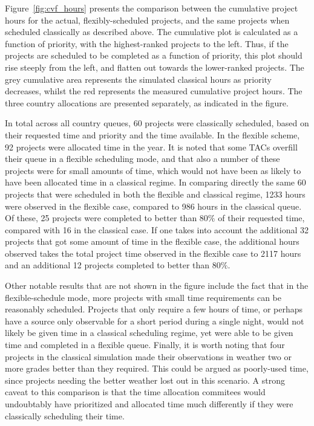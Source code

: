 \documentclass[]{spie}  %
\begin{document}
Figure~\ref{fig:cvf_hours} presents the comparison between the
cumulative project hours for the actual, flexibly-scheduled projects,
and the same projects when scheduled classically as described
above. The cumulative plot is calculated as a function of priority,
with the highest-ranked projects to the left. Thus, if the projects
are scheduled to be completed as a function of priority, this plot
should rise steeply from the left, and flatten out towards the
lower-ranked projects. The grey cumulative area represents the
simulated classical hours as priority decreases, whilst the red
represents the measured cumulative project hours. The three country
allocations are presented separately, as indicated in the figure.

In total across all country queues, 60 projects were classically
scheduled, based on their requested time and priority and the time
available. In the flexible scheme, 92 projects were allocated time in
the year. It is noted that some TACs overfill their queue in a
flexible scheduling mode, and that also a number of these projects
were for small amounts of time, which would not have been as likely to
have been allocated time in a classical regime. In comparing directly
the same 60 projects that were scheduled in both the flexible and
classical regime, 1233 hours were observed in the flexible case,
compared to 986 hours in the classical queue. Of these, 25 projects
were completed to better than 80$\%$ of their requested time, compared
with 16 in the classical case. If one takes into account the
additional 32 projects that got some amount of time in the flexible
case, the additional hours observed takes the total project time
observed in the flexible case to 2117 hours and an additional 12
projects completed to better than 80$\%$.

Other notable results that are not shown in the figure include the
fact that in the flexible-schedule mode, more projects with small time
requirements can be reasonably scheduled. Projects that only require a
few hours of time, or perhaps have a source only observable for a
short period during a single night, would not likely be given time in
a classical scheduling regime, yet were able to be given time and
completed in a flexible queue. Finally, it is worth noting that four
projects in the classical simulation made their observations in
weather two or more grades better than they required. This could be
argued as poorly-used time, since projects needing the better weather
lost out in this scenario. A strong caveat to this comparison is that
the time allocation commitees would undoubtably have prioritized and
allocated time much differently if they were classically scheduling
their time.
\end{document}
